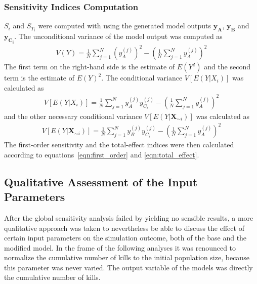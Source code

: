 \documentclass[11pt]{article}
\begin{document}
\subsubsection{Sensitivity Indices Computation}
$S_i$ and $S_{T_i}$ were computed with using the generated model outputs $\boldsymbol{y_A}$, $\boldsymbol{y_B}$ and $\boldsymbol{y_{C_i}}$. The unconditional variance of the model output was computed as
\begin{align}
V(Y) = \frac{1}{N} \sum_{j = 1}^N {\left( y_A^{(j)} \right)}^2 - \left( \frac{1}{N} \sum_{j = 1}^N y_A^{(j)} \right)^2
\end{align}
The first term on the right-hand side is the estimate of $E(Y^2)$ and the second term is the estimate of $E(Y)^2$. The conditional variance $V[E(Y|X_i)]$ was calculated as
\begin{align}
V[E(Y|X_i)] = \frac{1}{N} \sum_{j = 1}^N y_A^{(j)} y_{C_i}^{(j)} - \left( \frac{1}{N} \sum_{j = 1}^N y_A^{(j)} \right)^2
\end{align}
and the other necessary conditional variance $V[E(Y|\textbf{X}_{\sim i})]$ was calculated as
\begin{align}
V[E(Y|\textbf{X}_{\sim i})] = \frac{1}{N} \sum_{j = 1}^N y_B^{(j)} y_{C_i}^{(j)} - \left( \frac{1}{N} \sum_{j = 1}^N y_A^{(j)} \right)^2
\end{align}
The first-order sensitivity and the total-effect indices were then calculated according to equations~\eqref{eqn:first_order} and \eqref{eqn:total_effect}.

\subsection{Qualitative Assessment of the Input Parameters \cite{Epstein2002}}
After the global sensitivity analysis failed by yielding no sensible results, a more qualitative approach was taken to nevertheless be able to discuss the effect of certain input parameters on the simulation outcome, both of the base and the modified model. In the frame of the following analyses it was renounced to normalize the cumulative number of kills to the initial population size, because this parameter was never varied. The output variable of the models was directly the cumulative number of kills.
\end{document}
